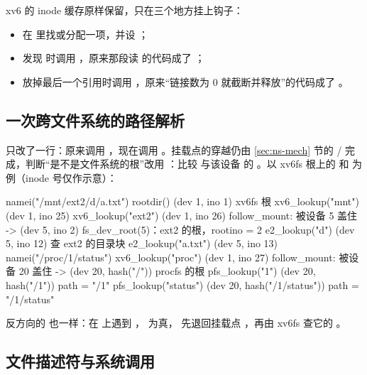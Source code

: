 xv6 的 inode 缓存原样保留，只在三个地方挂上钩子：

\begin{itemize}
  \item {} 在  里找或分配一项，并设 ；
  \item {} 发现  时调用 ，原来那段读  的代码成了 ；
  \item {} 放掉最后一个引用时调用 ，原来“链接数为 0 就截断并释放”的代码成了 。
\end{itemize}

\subsection{一次跨文件系统的路径解析}

 只改了一行：原来调用 ，现在调用 。挂载点的穿越仍由 \ref{sec:ns-mech} 节的 / 完成，判断“是不是文件系统的根”改用 ：比较  与该设备  的 。以 xv6fs 根上的  和  为例（inode 号仅作示意）：

\begin{txtcode}
namei("/mnt/ext2/d/a.txt")
  rootdir()             (dev 1, ino 1)      xv6fs 根
  xv6_lookup("mnt")     (dev 1, ino 25)
  xv6_lookup("ext2")    (dev 1, ino 26)     follow_mount: 被设备 5 盖住
                     -> (dev 5, ino 2)      fs_dev_root(5)：ext2 的根，rootino = 2
  e2_lookup("d")        (dev 5, ino 12)     查 ext2 的目录块
  e2_lookup("a.txt")    (dev 5, ino 13)
namei("/proc/1/status")
  xv6_lookup("proc")    (dev 1, ino 27)     follow_mount: 被设备 20 盖住
                     -> (dev 20, hash("/"))           procfs 的根
  pfs_lookup("1")       (dev 20, hash("/1"))          path = "/1"
  pfs_lookup("status")  (dev 20, hash("/1/status"))   path = "/1/status"
\end{txtcode}

反方向的  也一样：在  上遇到 ， 为真， 先退回挂载点 ，再由 xv6fs 查它的 。

\subsection{文件描述符与系统调用}


